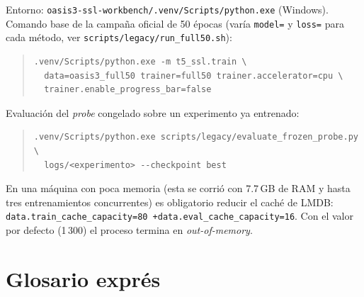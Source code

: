 \documentclass[11pt,a4paper]{article}
\begin{document}
Entorno: \texttt{oasis3-ssl-workbench/.venv/Scripts/python.exe} (Windows).
Comando base de la campaña oficial de 50 épocas (varía \texttt{model=} y
\texttt{loss=} para cada método, ver \texttt{scripts/legacy/run\_full50.sh}):

\begin{quote}
\begin{verbatim}
.venv/Scripts/python.exe -m t5_ssl.train \
  data=oasis3_full50 trainer=full50 trainer.accelerator=cpu \
  trainer.enable_progress_bar=false
\end{verbatim}
\end{quote}

Evaluación del \emph{probe} congelado sobre un experimento ya entrenado:

\begin{quote}
\begin{verbatim}
.venv/Scripts/python.exe scripts/legacy/evaluate_frozen_probe.py \
  logs/<experimento> --checkpoint best
\end{verbatim}
\end{quote}

\begin{ideabox}
En una máquina con poca memoria (esta se corrió con 7.7\,GB de RAM y hasta
tres entrenamientos concurrentes) es obligatorio reducir el caché de LMDB:
\texttt{data.train\_cache\_capacity=80 +data.eval\_cache\_capacity=16}. Con
el valor por defecto (1\,300) el proceso termina en \emph{out-of-memory}.
\end{ideabox}

\appendix
\section{Glosario exprés}
\end{document}
